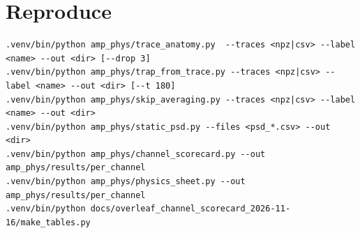 \documentclass[10pt]{article}
\begin{document}
\section*{Reproduce}
{\small\begin{verbatim}
.venv/bin/python amp_phys/trace_anatomy.py  --traces <npz|csv> --label <name> --out <dir> [--drop 3]
.venv/bin/python amp_phys/trap_from_trace.py --traces <npz|csv> --label <name> --out <dir> [--t 180]
.venv/bin/python amp_phys/skip_averaging.py --traces <npz|csv> --label <name> --out <dir>
.venv/bin/python amp_phys/static_psd.py --files <psd_*.csv> --out <dir>
.venv/bin/python amp_phys/channel_scorecard.py --out amp_phys/results/per_channel
.venv/bin/python amp_phys/physics_sheet.py --out amp_phys/results/per_channel
.venv/bin/python docs/overleaf_channel_scorecard_2026-11-16/make_tables.py
\end{verbatim}}
\end{document}
